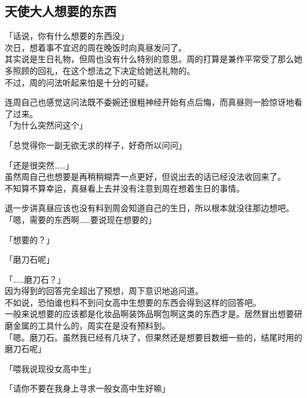 \subsection{天使大人想要的东西}

「话说，你有什么想要的东西没」\\

次日，想着事不宜迟的周在晚饭时向真昼发问了。\\

其实说是生日礼物，但周也没有什么特别的意思。周的打算是兼作平常受了那么她多照顾的回礼，在这个想法之下决定给她送礼物的。\\

不过，周的问法听起来怕是十分的可疑。

连周自己也感觉这问法既不委婉还很粗神经开始有点后悔，而真昼则一脸惊讶地看了过来。\\

「为什么突然问这个」

「总觉得你一副无欲无求的样子，好奇所以问问」

「还是很突然……」\\

虽然周自己也想要是再稍稍糊弄一点更好，但说出去的话已经没法收回来了。\\

不知算不算幸运，真昼看上去并没有注意到周在想着生日的事情。

退一步讲真昼应该也没有料到周会知道自己的生日，所以根本就没往那边想吧。\\

「嗯，需要的东西啊……要说现在想要的」

「想要的？」

「磨刀石呢」

「……磨刀石？」\\

因为得到的回答完全超出了预想，周下意识地追问道。\\

不如说，恐怕谁也料不到问女高中生想要的东西会得到这样的回答吧。\\

一般来说想要的应该都是化妆品啊装饰品啊包啊这类的东西才是。居然冒出想要研磨金属的工具什么的，周实在是没有预料到。\\

「嗯。磨刀石。虽然我已经有几块了，但果然还是想要目数细一些的，结尾时用的磨刀石呢」

「喂我说现役女高中生」

「请你不要在我身上寻求一般女高中生好嘛」\\

